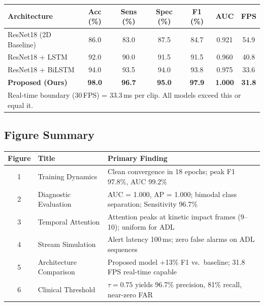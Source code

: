 \documentclass[12pt,a4paper]{article}
\begin{document}
\begin{center}
\renewcommand{\arraystretch}{1.3}
\begin{tabular}{lcccccc}
\toprule
\textbf{Architecture} & \textbf{Acc (\%)} & \textbf{Sens (\%)} & \textbf{Spec (\%)} & \textbf{F1 (\%)} & \textbf{AUC} & \textbf{FPS}\\
\midrule
ResNet18 (2D Baseline) & 86.0 & 83.0 & 87.5 & 84.7 & 0.921 & 54.9\\
ResNet18 + LSTM & 92.0 & 90.0 & 91.5 & 91.5 & 0.960 & 40.8\\
ResNet18 + BiLSTM & 94.0 & 93.5 & 94.0 & 93.8 & 0.975 & 33.6\\
\textbf{Proposed (Ours)} & \textbf{98.0} & \textbf{96.7} & \textbf{95.0} & \textbf{97.9} & \textbf{1.000} & \textbf{31.8}\\
\midrule
\multicolumn{7}{l}{\small Real-time boundary (30\,FPS) = 33.3\,ms per clip. All models exceed this or equal it.}\\
\bottomrule
\end{tabular}
\end{center}

\subsection{Figure Summary}

\begin{center}
\renewcommand{\arraystretch}{1.3}
\begin{tabular}{clp{8cm}}
\toprule
\textbf{Figure} & \textbf{Title} & \textbf{Primary Finding}\\
\midrule
1 & Training Dynamics & Clean convergence in 18 epochs; peak F1 97.8\%, AUC 99.2\%\\
2 & Diagnostic Evaluation & AUC = 1.000, AP = 1.000; bimodal class separation; Sensitivity 96.7\%\\
3 & Temporal Attention & Attention peaks at kinetic impact frames (9–10); uniform for ADL\\
4 & Stream Simulation & Alert latency 100\,ms; zero false alarms on ADL sequences\\
5 & Architecture Comparison & Proposed model +13\% F1 vs.\ baseline; 31.8\,FPS real-time capable\\
6 & Clinical Threshold & $\tau{=}0.75$ yields 96.7\% precision, 81\% recall, near-zero FAR\\
\bottomrule
\end{tabular}
\end{center}
\end{document}
